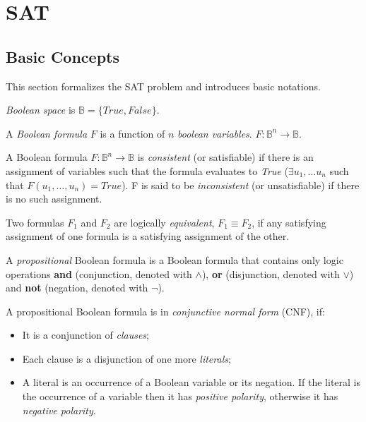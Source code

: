 \chapter{SAT}
\label{chap:sat}

\section{Basic Concepts}

This section formalizes the SAT problem and introduces basic notations.

\begin{mydef}
  \emph{Boolean space} is $\mathbb{B} = \{ True, False \}$.
\end{mydef}

\begin{mydef}
  A \emph{Boolean formula} $F$ is a function of $n$ \emph{boolean variables}.
  $F : \mathbb{B}^n \rightarrow \mathbb{B}$.
\end{mydef}

\begin{mydef}
  A Boolean formula $F : \mathbb{B}^n \rightarrow \mathbb{B}$ is
  \emph{consistent} (or satisfiable) if there is an assignment of
  variables such that the formula evaluates to \emph{True}
  ($\exists u_1, \ldots u_n$ such that $F(u_1, \ldots, u_n) = True$).
  F is said to be \emph{inconsistent} (or unsatisfiable) if
  there is no such assignment.
\end{mydef}

\begin{mydef}
  Two formulas $F_1$ and $F_2$ are logically \emph{equivalent},
  $F_1 \equiv F_2$, if any satisfying assignment of one formula is
  a satisfying assignment of the other.
\end{mydef}

\begin{mydef}
  A \emph{propositional} Boolean formula is a Boolean formula that contains only
  logic operations \textbf{and} (conjunction, denoted with $\land$),
  \textbf{or} (disjunction, denoted with $\lor$) and \textbf{not}
  (negation, denoted with $\neg$).
\end{mydef}

A propositional Boolean formula is in \emph{conjunctive normal form}
(CNF), if:
\begin{itemize}
  \item It is a conjunction of \emph{clauses};
  \item Each clause is a disjunction of one more \emph{literals};
  \item A literal is an occurrence of a Boolean variable or its negation.
  If the literal is the occurrence of a variable
  then it has \emph{positive polarity}, otherwise it has \emph{negative
  polarity}.
\end{itemize}

